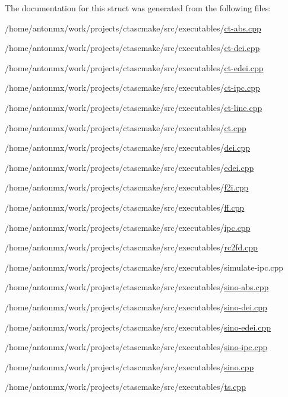The documentation for this struct was generated from the following files:\begin{DoxyCompactItemize}
\item 
/home/antonmx/work/projects/ctascmake/src/executables/\hyperlink{ct-abs_8cpp}{ct-\/abs.cpp}\item 
/home/antonmx/work/projects/ctascmake/src/executables/\hyperlink{ct-dei_8cpp}{ct-\/dei.cpp}\item 
/home/antonmx/work/projects/ctascmake/src/executables/\hyperlink{ct-edei_8cpp}{ct-\/edei.cpp}\item 
/home/antonmx/work/projects/ctascmake/src/executables/\hyperlink{ct-ipc_8cpp}{ct-\/ipc.cpp}\item 
/home/antonmx/work/projects/ctascmake/src/executables/\hyperlink{ct-line_8cpp}{ct-\/line.cpp}\item 
/home/antonmx/work/projects/ctascmake/src/executables/\hyperlink{ct_8cpp}{ct.cpp}\item 
/home/antonmx/work/projects/ctascmake/src/executables/\hyperlink{dei_8cpp}{dei.cpp}\item 
/home/antonmx/work/projects/ctascmake/src/executables/\hyperlink{edei_8cpp}{edei.cpp}\item 
/home/antonmx/work/projects/ctascmake/src/executables/\hyperlink{f2i_8cpp}{f2i.cpp}\item 
/home/antonmx/work/projects/ctascmake/src/executables/\hyperlink{ff_8cpp}{ff.cpp}\item 
/home/antonmx/work/projects/ctascmake/src/executables/\hyperlink{ipc_8cpp}{ipc.cpp}\item 
/home/antonmx/work/projects/ctascmake/src/executables/\hyperlink{rc2fd_8cpp}{rc2fd.cpp}\item 
/home/antonmx/work/projects/ctascmake/src/executables/simulate-\/ipc.cpp\item 
/home/antonmx/work/projects/ctascmake/src/executables/\hyperlink{sino-abs_8cpp}{sino-\/abs.cpp}\item 
/home/antonmx/work/projects/ctascmake/src/executables/\hyperlink{sino-dei_8cpp}{sino-\/dei.cpp}\item 
/home/antonmx/work/projects/ctascmake/src/executables/\hyperlink{sino-edei_8cpp}{sino-\/edei.cpp}\item 
/home/antonmx/work/projects/ctascmake/src/executables/\hyperlink{sino-ipc_8cpp}{sino-\/ipc.cpp}\item 
/home/antonmx/work/projects/ctascmake/src/executables/\hyperlink{sino_8cpp}{sino.cpp}\item 
/home/antonmx/work/projects/ctascmake/src/executables/\hyperlink{ts_8cpp}{ts.cpp}\end{DoxyCompactItemize}
